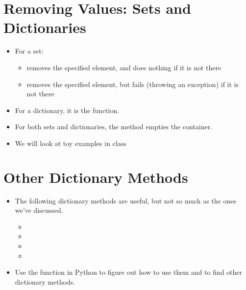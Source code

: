 \documentclass[letterpaper,10pt,english]{sphinxmanual}
\begin{document}
\section{Removing Values: Sets and Dictionaries}
\label{\detokenize{lecture_notes/lec16_dictionaries1:removing-values-sets-and-dictionaries}}\begin{itemize}
\item {} 
For a set:
\begin{itemize}
\item {} 
 removes the specified element, and does nothing if it
is not there

\item {} 
 removes the specified element, but fails (throwing an
exception) if it is not there

\end{itemize}

\item {} 
For a dictionary, it is the  function.

\item {} 
For both sets and dictionaries, the  method empties the
container.

\item {} 
We will look at toy examples in class

\end{itemize}


\section{Other Dictionary Methods}
\label{\detokenize{lecture_notes/lec16_dictionaries1:other-dictionary-methods}}\begin{itemize}
\item {} 
The following dictionary methods are useful, but not so much as the
ones we’ve discussed.
\begin{itemize}
\item {} 

\item {} 

\item {} 

\item {} 

\end{itemize}

\item {} 
Use the  function in Python to figure out how to use them and
to find other dictionary methods.

\end{itemize}
\end{document}
